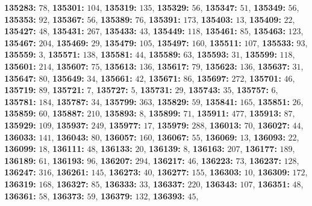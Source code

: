 \textsf{\bfseries 135283:} $78$, \textsf{\bfseries 135301:} $104$, \textsf{\bfseries 135319:} $135$, \textsf{\bfseries 135329:} $56$, \textsf{\bfseries 135347:} $51$, \textsf{\bfseries 135349:} $56$, \textsf{\bfseries 135353:} $92$, \textsf{\bfseries 135367:} $56$, \textsf{\bfseries 135389:} $76$, \textsf{\bfseries 135391:} $173$, \textsf{\bfseries 135403:} $13$, \textsf{\bfseries 135409:} $22$, \textsf{\bfseries 135427:} $48$, \textsf{\bfseries 135431:} $267$, \textsf{\bfseries 135433:} $43$, \textsf{\bfseries 135449:} $118$, \textsf{\bfseries 135461:} $85$, \textsf{\bfseries 135463:} $123$, \textsf{\bfseries 135467:} $204$, \textsf{\bfseries 135469:} $29$, \textsf{\bfseries 135479:} $105$, \textsf{\bfseries 135497:} $160$, \textsf{\bfseries 135511:} $107$, \textsf{\bfseries 135533:} $93$, \textsf{\bfseries 135559:} $3$, \textsf{\bfseries 135571:} $138$, \textsf{\bfseries 135581:} $44$, \textsf{\bfseries 135589:} $63$, \textsf{\bfseries 135593:} $31$, \textsf{\bfseries 135599:} $118$, \textsf{\bfseries 135601:} $214$, \textsf{\bfseries 135607:} $75$, \textsf{\bfseries 135613:} $136$, \textsf{\bfseries 135617:} $79$, \textsf{\bfseries 135623:} $136$, \textsf{\bfseries 135637:} $31$, \textsf{\bfseries 135647:} $80$, \textsf{\bfseries 135649:} $34$, \textsf{\bfseries 135661:} $42$, \textsf{\bfseries 135671:} $86$, \textsf{\bfseries 135697:} $272$, \textsf{\bfseries 135701:} $46$, \textsf{\bfseries 135719:} $89$, \textsf{\bfseries 135721:} $7$, \textsf{\bfseries 135727:} $5$, \textsf{\bfseries 135731:} $29$, \textsf{\bfseries 135743:} $35$, \textsf{\bfseries 135757:} $6$, \textsf{\bfseries 135781:} $184$, \textsf{\bfseries 135787:} $34$, \textsf{\bfseries 135799:} $363$, \textsf{\bfseries 135829:} $59$, \textsf{\bfseries 135841:} $165$, \textsf{\bfseries 135851:} $26$, \textsf{\bfseries 135859:} $60$, \textsf{\bfseries 135887:} $210$, \textsf{\bfseries 135893:} $8$, \textsf{\bfseries 135899:} $71$, \textsf{\bfseries 135911:} $477$, \textsf{\bfseries 135913:} $87$, \textsf{\bfseries 135929:} $109$, \textsf{\bfseries 135937:} $249$, \textsf{\bfseries 135977:} $17$, \textsf{\bfseries 135979:} $288$, \textsf{\bfseries 136013:} $70$, \textsf{\bfseries 136027:} $44$, \textsf{\bfseries 136033:} $141$, \textsf{\bfseries 136043:} $80$, \textsf{\bfseries 136057:} $160$, \textsf{\bfseries 136067:} $55$, \textsf{\bfseries 136069:} $13$, \textsf{\bfseries 136093:} $22$, \textsf{\bfseries 136099:} $18$, \textsf{\bfseries 136111:} $48$, \textsf{\bfseries 136133:} $20$, \textsf{\bfseries 136139:} $8$, \textsf{\bfseries 136163:} $207$, \textsf{\bfseries 136177:} $189$, \textsf{\bfseries 136189:} $61$, \textsf{\bfseries 136193:} $96$, \textsf{\bfseries 136207:} $294$, \textsf{\bfseries 136217:} $46$, \textsf{\bfseries 136223:} $73$, \textsf{\bfseries 136237:} $128$, \textsf{\bfseries 136247:} $316$, \textsf{\bfseries 136261:} $145$, \textsf{\bfseries 136273:} $40$, \textsf{\bfseries 136277:} $155$, \textsf{\bfseries 136303:} $10$, \textsf{\bfseries 136309:} $172$, \textsf{\bfseries 136319:} $168$, \textsf{\bfseries 136327:} $85$, \textsf{\bfseries 136333:} $33$, \textsf{\bfseries 136337:} $220$, \textsf{\bfseries 136343:} $107$, \textsf{\bfseries 136351:} $48$, \textsf{\bfseries 136361:} $58$, \textsf{\bfseries 136373:} $59$, \textsf{\bfseries 136379:} $132$, \textsf{\bfseries 136393:} $45$, 
